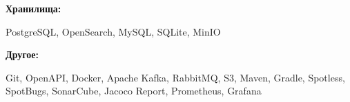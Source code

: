 \documentclass[9pt]{developercv} %
\begin{document}
    \begin{minipage}[t]{0.2\textwidth}
        \textbf{Хранилища:}
    \end{minipage}
    \hfill
    \begin{minipage}[t]{0.73\textwidth}
      PostgreSQL, OpenSearch, MySQL, SQLite, MinIO
    \end{minipage}
    \vspace{2mm}
    
    \begin{minipage}[t]{0.2\textwidth}
        \textbf{Другое:}
    \end{minipage}
    \hfill
    \begin{minipage}[t]{0.735\textwidth}
    Git, OpenAPI, Docker, Apache Kafka, RabbitMQ, S3, Maven, Gradle, Spotless, SpotBugs, SonarCube, Jacoco Report, Prometheus, Grafana
    \end{minipage}

\end{document}
